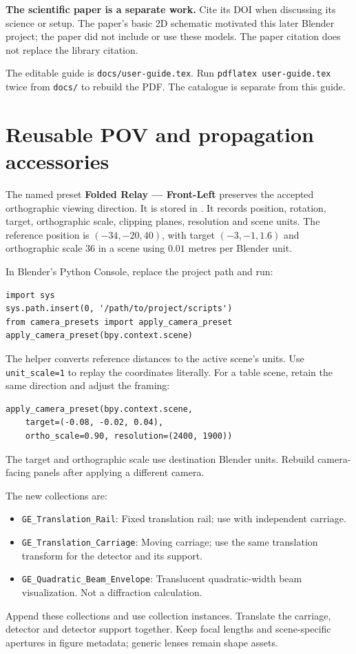 \documentclass[11pt,a4paper]{article}
\begin{document}
\textbf{The scientific paper is a separate work.} Cite its DOI when discussing its science or setup. The paper's basic 2D schematic motivated this later Blender project; the paper did not include or use these models. The paper citation does not replace the library citation.

The editable guide is \texttt{docs/user-guide.tex}. Run \texttt{pdflatex user-guide.tex} twice from \texttt{docs/} to rebuild the PDF. The catalogue is separate from this guide.

\clearpage
\section*{Reusable POV and propagation accessories}
The named preset \textbf{Folded Relay --- Front-Left} preserves the accepted orthographic viewing direction. It is stored in
.
It records position, rotation, target, orthographic scale, clipping planes, resolution and scene units. The reference position is $(-34,-20,40)$, with target $(-3,-1,1.6)$ and orthographic scale $36$ in a scene using $0.01$ metres per Blender unit.

In Blender's Python Console, replace the project path and run:
\begin{Verbatim}[fontsize=\small]
import sys
sys.path.insert(0, '/path/to/project/scripts')
from camera_presets import apply_camera_preset
apply_camera_preset(bpy.context.scene)
\end{Verbatim}
The helper converts reference distances to the active scene's units. Use \texttt{unit\_scale=1} to replay the coordinates literally. For a table scene, retain the same direction and adjust the framing:
\begin{Verbatim}[fontsize=\small]
apply_camera_preset(bpy.context.scene,
    target=(-0.08, -0.02, 0.04),
    ortho_scale=0.90, resolution=(2400, 1900))
\end{Verbatim}
The target and orthographic scale use destination Blender units. Rebuild camera-facing panels after applying a different camera.

The new collections are:
\begin{itemize}
\item \texttt{GE\_Translation\_Rail}: Fixed translation rail; use with independent carriage.
\item \texttt{GE\_Translation\_Carriage}: Moving carriage; use the same translation transform for the detector and its support.
\item \texttt{GE\_Quadratic\_Beam\_Envelope}: Translucent quadratic-width beam visualization. Not a diffraction calculation.
\end{itemize}
Append these collections and use collection instances. Translate the carriage, detector and detector support together. Keep focal lengths and scene-specific apertures in figure metadata; generic lenses remain shape assets.
\end{document}
